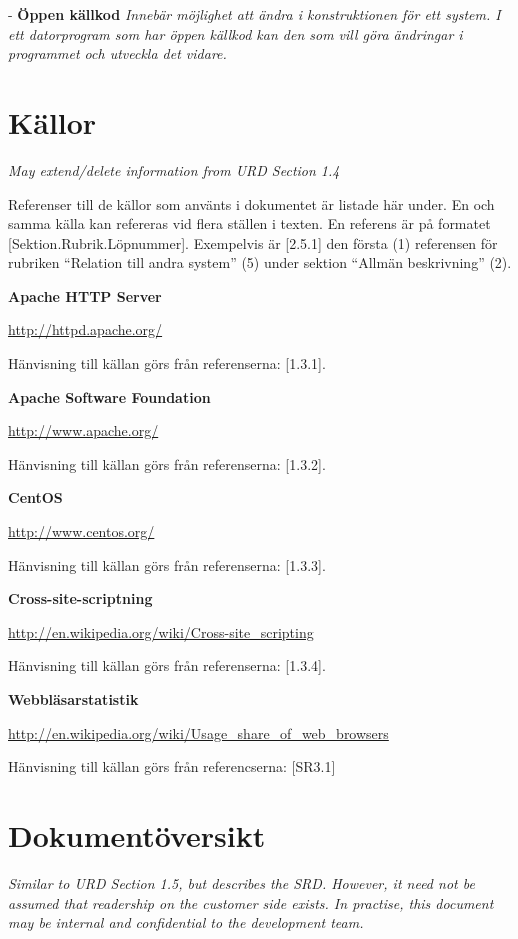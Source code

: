 \documentclass[a4paper, twoside, 11pt, titlepage]{article}
\begin{document}
- \textbf{Öppen källkod} \emph{Innebär möjlighet att ändra i konstruktionen för ett system. I ett datorprogram som har öppen källkod kan den som vill göra ändringar i programmet och utveckla det vidare.}

\clearpage
\section{Källor}


\emph{May extend/delete information from URD Section 1.4}

Referenser till de källor som använts i dokumentet är listade här under. En och samma källa kan refereras vid flera ställen i texten. En referens är på formatet [Sektion.Rubrik.Löpnummer]. Exempelvis är [2.5.1] den första (1) referensen för rubriken ``Relation till andra system'' (5) under sektion ``Allmän beskrivning'' (2).

\textbf{Apache HTTP Server}

\url{http://httpd.apache.org/}

Hänvisning till källan görs från referenserna: [1.3.1].

\textbf{Apache Software Foundation}

\url{http://www.apache.org/}

Hänvisning till källan görs från referenserna: [1.3.2].

\textbf{CentOS}

\url{http://www.centos.org/}

Hänvisning till källan görs från referenserna: [1.3.3].

\textbf{Cross-site-scriptning}

\url{http://en.wikipedia.org/wiki/Cross-site_scripting}

Hänvisning till källan görs från referenserna: [1.3.4].

\textbf{Webbläsarstatistik}

\url{http://en.wikipedia.org/wiki/Usage_share_of_web_browsers}

Hänvisning till källan görs från referencserna: [SR3.1]

\clearpage
\section{Dokumentöversikt}


\emph{Similar to URD Section 1.5, but describes the SRD. However, it need not be assumed that readership on the customer side exists. In practise, this document may be internal and confidential to the development team.}
\end{document}
